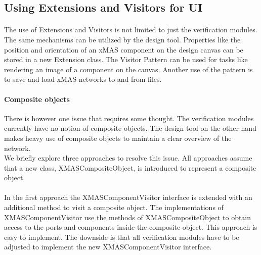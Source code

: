 \documentclass[a4paper,11pt]{article}
\begin{document}
\subsection{Using Extensions and Visitors for UI}

\paragraph{}
The use of Extensions and Visitors is not limited to just the verification modules.
The same mechanisms can be utilized by the design tool. Properties like the
position and orientation of an xMAS component on the design canvas can be
stored in a new Extension class. The Visitor Pattern can be used for
tasks like rendering an image of a component on the canvas. Another use of
the pattern is to save and load xMAS networks to and from files.

\paragraph{Composite objects}
There is however one issue that requires some thought. The verification modules
currently have no notion of composite objects. The design tool on the other hand
makes heavy use of composite objects to maintain a clear overview of the network.\\
We briefly explore three approaches to resolve this issue. All approaches assume that
a new class, XMASCompositeObject, is introduced to represent a composite object.

\paragraph{}
In the first approach the XMASComponentVisitor interface is extended with an
additional method to visit a composite object. The implementations of XMASComponentVisitor
use the methods of XMASCompositeObject to obtain access to the ports and components
inside the composite object. This approach is easy to implement. The downside is
that all verification modules have to be adjusted to implement the new XMASComponentVisitor
interface.
\end{document}
